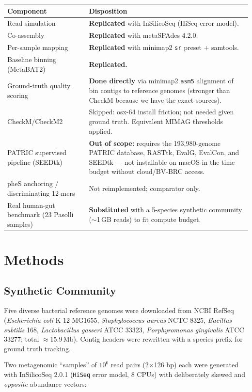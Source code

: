 \documentclass[11pt]{article}
\begin{document}
\begin{tabularx}{\linewidth}{lX}
\toprule
\textbf{Component} & \textbf{Disposition} \\
\midrule
Read simulation            & \textbf{Replicated} with InSilicoSeq (HiSeq error model). \\
Co-assembly                & \textbf{Replicated} with metaSPAdes 4.2.0. \\
Per-sample mapping         & \textbf{Replicated} with minimap2 \texttt{sr} preset + samtools. \\
Baseline binning (MetaBAT2) & \textbf{Replicated.} \\
Ground-truth quality scoring & \textbf{Done directly} via minimap2 \texttt{asm5}
alignment of bin contigs to reference genomes (stronger than CheckM because we have
the exact sources). \\
CheckM/CheckM2             & Skipped: osx-64 install friction; not needed given
ground truth. Equivalent MIMAG thresholds applied. \\
PATRIC supervised pipeline (SEEDtk) & \textbf{Out of scope:} requires the
193{,}980-genome PATRIC database, RASTtk, EvalG, EvalCon, and SEEDtk --- not
installable on macOS in the time budget without cloud/BV-BRC access. \\
pheS anchoring / discriminating 12-mers & Not reimplemented; comparator only. \\
Real human-gut benchmark (23 Pasolli samples) & \textbf{Substituted} with a
5-species synthetic community ($\sim$1\,GB reads) to fit compute budget. \\
\bottomrule
\end{tabularx}

\section{Methods}

\subsection{Synthetic Community}
Five diverse bacterial reference genomes were downloaded from NCBI RefSeq
(\emph{Escherichia coli} K-12 MG1655, \emph{Staphylococcus aureus} NCTC 8325,
\emph{Bacillus subtilis} 168, \emph{Lactobacillus gasseri} ATCC 33323,
\emph{Porphyromonas gingivalis} ATCC 33277; total $\approx$15.9\,Mb). Contig
headers were rewritten with a species prefix for ground truth tracking.

Two metagenomic ``samples'' of $10^6$ read pairs (2$\times$126 bp) each were
generated with InSilicoSeq 2.0.1 (\texttt{HiSeq} error model, 8 CPUs) with
deliberately skewed and \emph{opposite} abundance vectors:
\end{document}

